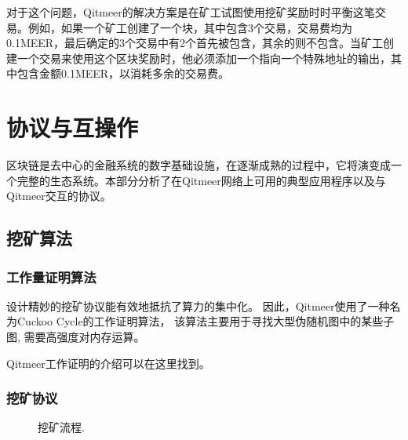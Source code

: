 \documentclass[a4paper,11pt]{article}
\begin{document}
对于这个问题，Qitmeer的解决方案是在矿工试图使用挖矿奖励时时平衡这笔交易。例如，如果一个矿工创建了一个块，其中包含3个交易，交易费均为0.1MEER，最后确定的3个交易中有2个首先被包含，其余的则不包含。当矿工创建一个交易来使用这个区块奖励时，他必须添加一个指向一个特殊地址的输出，其中包含金额0.1MEER，以消耗多余的交易费。

\section{协议与互操作}
区块链是去中心的金融系统的数字基础设施，在逐渐成熟的过程中，它将演变成一个完整的生态系统。本部分分析了在Qitmeer网络上可用的典型应用程序以及与Qitmeer交互的协议。

\subsection{挖矿算法}
\subsubsection{工作量证明算法}


设计精妙的挖矿协议能有效地抵抗了算力的集中化。
因此，Qitmeer使用了一种名为Cuckoo Cycle\cite{cuckoocycle}的工作证明算法，
该算法主要用于寻找大型伪随机图中的某些子图, 需要高强度对内存运算。

Qitmeer工作证明的介绍可以在这里\cite{qitmeerpow}找到。



\subsubsection{挖矿协议}

\begin{figure}[ht]
	\centerline{%
	}
	\caption{挖矿流程.}
\end{figure}
\end{document}

